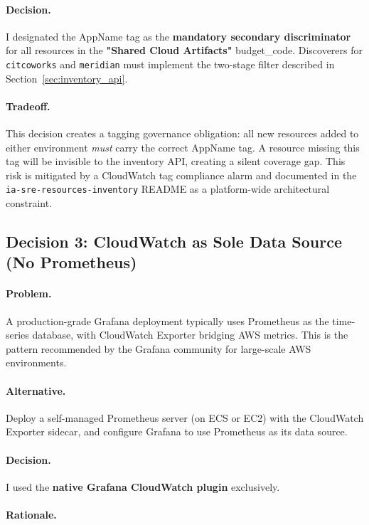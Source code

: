 \paragraph{Decision.}
I designated the AppName tag as the \textbf{mandatory secondary
discriminator} for all resources in the \textbf{"Shared Cloud Artifacts"}
budget\_code. Discoverers for \texttt{citcoworks} and \texttt{meridian}
must implement the two-stage filter described in
Section~\ref{sec:inventory_api}.

\paragraph{Tradeoff.}
This decision creates a tagging governance obligation: all new resources
added to either environment \emph{must} carry the correct AppName
tag. A resource missing this tag will be invisible to the inventory API,
creating a silent coverage gap. This risk is mitigated by a CloudWatch
tag compliance alarm and documented in the \texttt{ia-sre-resources-inventory}
README as a platform-wide architectural constraint.

\subsection{Decision 3: CloudWatch as Sole Data Source (No Prometheus)}
\label{sec:decision_cloudwatch_only}

\paragraph{Problem.}
A production-grade Grafana deployment typically uses Prometheus as the
time-series database, with CloudWatch Exporter bridging AWS metrics.
This is the pattern recommended by the Grafana community for large-scale
AWS environments.

\paragraph{Alternative.}
Deploy a self-managed Prometheus server (on ECS or EC2) with the
CloudWatch Exporter sidecar, and configure Grafana to use Prometheus
as its data source.

\paragraph{Decision.} I used the \textbf{native Grafana CloudWatch plugin}
exclusively.

\paragraph{Rationale.}

